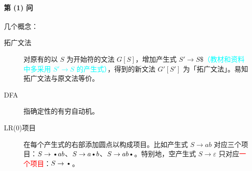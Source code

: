 \documentclass[UTF8]{ctexart}
\newcommand\D{\text{\textbullet}}
\begin{document}
\paragraph{第 (1) 问} 几个概念：

\begin{tcolorbox}[colback=violet!5, colframe=violet, boxrule=1pt, breakable]
\begin{description}
    \item[拓广文法] 对原有的以 $S$ 为开始符的文法 $G[S]$，增加产生式 $S'\to S\$ $\textcolor{cyan}{（教材和资料中多采用 $S'\to S$ 的产生式）}，得到的新文法 $G'[S']$ 为「拓广文法」。易知拓广文法与原文法等价。
    \item[DFA] 指确定性的有穷自动机。
    \item[LR(0)项目] 在每个产生式的右部添加圆点以构成项目。比如产生式 $S\to ab$ 对应三个项目：$S\to \D ab$、$S\to a\D b$、$S\to ab\D$。特别地，空产生式 $S\to\varepsilon$ 只对应\textcolor{red}{一个项目}：$S\to\D$。
\end{description}
\end{tcolorbox}

\BgThispage
\end{document}
